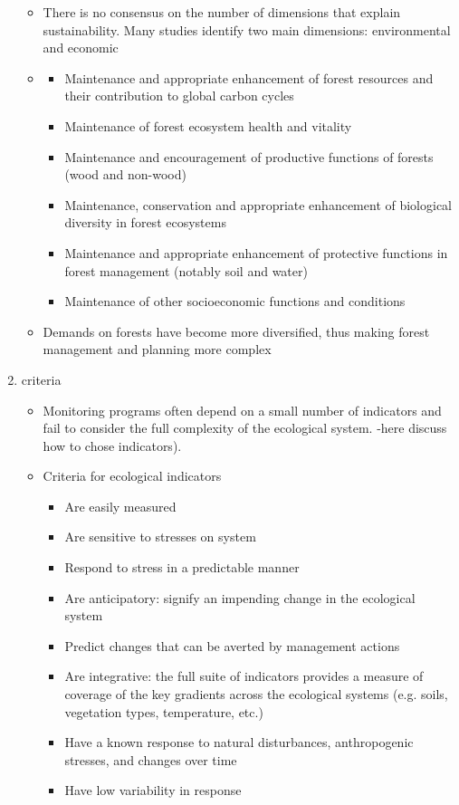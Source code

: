 \documentclass{article}
\begin{document}
\begin{enumerate}
\begin{itemize}
        \item There is no consensus on the number of dimensions that explain sustainability. Many studies identify two main dimensions: environmental and economic \cite{martinez-vega_assessing_2016}
        \item \cite{makela_using_2012}
        \begin{itemize}
            \item Maintenance and appropriate enhancement of forest resources and their contribution to global carbon cycles
            \item Maintenance of forest ecosystem health and vitality
            \item Maintenance and encouragement of productive functions of forests (wood and non-wood)
            \item Maintenance, conservation and appropriate enhancement of biological diversity in forest ecosystems
            \item Maintenance and appropriate enhancement of protective functions in forest management (notably soil and water)
            \item Maintenance of other socioeconomic functions and conditions
        \end{itemize}
        \item Demands on forests have become more diversified, thus making forest management and planning more complex \cite{eggers2017balancing}
    \end{itemize}
    \item criteria
    \begin{itemize}
        \item Monitoring programs often depend on a small number of indicators and fail to consider the full complexity of the ecological system. \cite{dale2001challenges} -here discuss how to chose indicators).
        \item Criteria for ecological indicators \cite{dale2001challenges} 
        \begin{itemize}
            \item Are easily measured
            \item Are sensitive to stresses on system
            \item Respond to stress in a predictable manner
            \item Are anticipatory: signify an impending change in the ecological system
            \item Predict changes that can be averted by management actions
            \item Are integrative: the full suite of indicators provides a measure of coverage of the key gradients across the ecological systems (e.g. soils, vegetation types, temperature, etc.)
            \item Have a known response to natural disturbances, anthropogenic stresses, and changes over time
            \item  Have low variability in response
        \end{itemize}
        

\end{itemize}
\end{enumerate}
\end{document}

